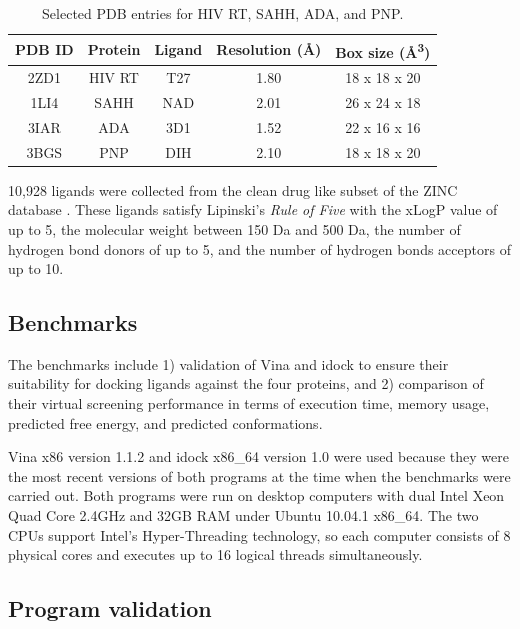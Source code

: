 \begin{table}
\centering
\begin{tabular*}
{\linewidth}
{@{\extracolsep{\fill}}ccccc}
\toprule
PDB ID & Protein & Ligand & Resolution (\AA) & Box size (\AA\textsuperscript{3})\\
\midrule
2ZD1 & HIV RT & T27 & 1.80 & 18 x 18 x 20\\
1LI4 & SAHH   & NAD & 2.01 & 26 x 24 x 18\\
3IAR & ADA    & 3D1 & 1.52 & 22 x 16 x 16\\
3BGS & PNP    & DIH & 2.10 & 18 x 18 x 20\\
\bottomrule
\end{tabular*}
\caption{Selected PDB entries for HIV RT, SAHH, ADA, and PNP.}
\label{idock:SelectedPDBEntries}
\end{table}

10,928 ligands were collected from the clean drug like subset of the ZINC database \citep{532,1178}. These ligands satisfy Lipinski's \textit{Rule of Five} \citep{169} with the xLogP value of up to 5, the molecular weight between 150 Da and 500 Da, the number of hydrogen bond donors of up to 5, and the number of hydrogen bonds acceptors of up to 10.

\subsection{Benchmarks}

The benchmarks include 1) validation of Vina and idock to ensure their suitability for docking ligands against the four proteins, and 2) comparison of their virtual screening performance in terms of execution time, memory usage, predicted free energy, and predicted conformations.

Vina x86 version 1.1.2 and idock x86\_64 version 1.0 were used because they were the most recent versions of both programs at the time when the benchmarks were carried out. Both programs were run on desktop computers with dual Intel Xeon Quad Core 2.4GHz and 32GB RAM under Ubuntu 10.04.1 x86\_64. The two CPUs support Intel's Hyper-Threading technology, so each computer consists of 8 physical cores and executes up to 16 logical threads simultaneously.

\subsection{Program validation}

